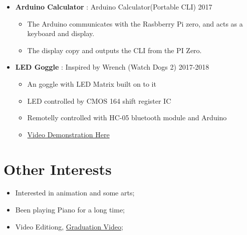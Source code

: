 \begin{itemize}
    \item \textbf{Arduino Calculator} : Arduino Calculator(Portable CLI)\dashdiv{} 2017

    \begin{itemize}
      \item The Arduino communicates with the Rasbberry Pi zero, and acts as a keyboard and display.
      \item The display copy and outputs the CLI from the PI Zero.
    \end{itemize}

    \item \textbf{LED Goggle} : Inspired by Wrench (Watch Dogs 2)\dashdiv{} 2017-2018

    \begin{itemize}
      \item An goggle with LED Matrix built on to it
      \item LED controlled by CMOS 164 shift register IC
      \item Remotelly controlled with HC-05 bluetooth module and Arduino
      \item \href{https://www.bilibili.com/video/av33283411/}{\color{link}Video Demonstration Here}
    \end{itemize}

  \end{itemize}

  \section{Other Interests}

  \begin{itemize}[itemsep=0.1\parskip]
    \item Interested in animation and some arts; 
    \item Been playing Piano for a long time;
    \item Video Editiong, \href{https://www.bilibili.com/video/av55212868/}{\color{link}Graduation Video};
  \end{itemize}


